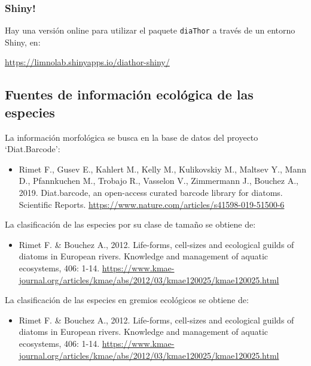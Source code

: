 \documentclass[
]{book}
\providecommand{\tightlist}{%
  \setlength{\itemsep}{0pt}\setlength{\parskip}{0pt}}
\begin{document}
\hypertarget{shiny}{%
\subsubsection{Shiny!}\label{shiny}}

Hay una versión online para utilizar el paquete \texttt{diaThor} a través de un entorno Shiny, en:

\url{https://limnolab.shinyapps.io/diathor-shiny/}

\hypertarget{fuentes-de-informaciuxf3n-ecoluxf3gica-de-las-especies}{%
\subsection{Fuentes de información ecológica de las especies}\label{fuentes-de-informaciuxf3n-ecoluxf3gica-de-las-especies}}

La información morfológica se busca en la base de datos del proyecto `Diat.Barcode':

\begin{itemize}
\tightlist
\item
  Rimet F., Gusev E., Kahlert M., Kelly M., Kulikovskiy M., Maltsev Y., Mann D., Pfannkuchen M., Trobajo R., Vasselon V., Zimmermann J., Bouchez A., 2019. Diat.barcode, an open-access curated barcode library for diatoms. Scientific Reports. \url{https://www.nature.com/articles/s41598-019-51500-6}
\end{itemize}

La clasificación de las especies por su clase de tamaño se obtiene de:

\begin{itemize}
\tightlist
\item
  Rimet F. \& Bouchez A., 2012. Life-forms, cell-sizes and ecological guilds of diatoms in European rivers. Knowledge and management of aquatic ecosystems, 406: 1-14. \url{https://www.kmae-journal.org/articles/kmae/abs/2012/03/kmae120025/kmae120025.html}
\end{itemize}

La clasificación de las especies en gremios ecológicos se obtiene de:

\begin{itemize}
\tightlist
\item
  Rimet F. \& Bouchez A., 2012. Life-forms, cell-sizes and ecological guilds of diatoms in European rivers. Knowledge and management of aquatic ecosystems, 406: 1-14. \url{https://www.kmae-journal.org/articles/kmae/abs/2012/03/kmae120025/kmae120025.html}
\end{itemize}
\end{document}
